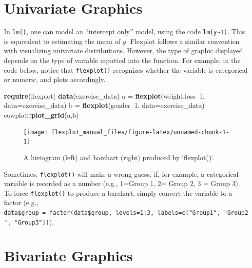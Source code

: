 \documentclass[,]{book}
\newenvironment{Shaded}{\begin{snugshade}}{\end{snugshade}}
\newcommand{\KeywordTok}[1]{\textcolor[rgb]{0.13,0.29,0.53}{\textbf{#1}}}
\newcommand{\DataTypeTok}[1]{\textcolor[rgb]{0.13,0.29,0.53}{#1}}
\newcommand{\DecValTok}[1]{\textcolor[rgb]{0.00,0.00,0.81}{#1}}
\newcommand{\StringTok}[1]{\textcolor[rgb]{0.31,0.60,0.02}{#1}}
\newcommand{\OperatorTok}[1]{\textcolor[rgb]{0.81,0.36,0.00}{\textbf{#1}}}
\newcommand{\NormalTok}[1]{#1}
\begin{document}
\chapter*{Univariate Graphics}\label{univariate-graphics}

In \texttt{lm()}, one can model an ``intercept only'' model, using the
code \texttt{lm(y\textasciitilde{}1)}. This is equivalent to estimating
the mean of \(y\). Flexplot follows a similar convention with
visualizing univariate distributions. However, the type of graphic
displayed depends on the type of variable inputted into the function.
For example, in the code below, notice that \texttt{flexplot()}
recognizes whether the variable is categorical or numeric, and plots
accordingly.

\begin{Shaded}
\begin{Highlighting}[]
\KeywordTok{require}\NormalTok{(flexplot)}
\KeywordTok{data}\NormalTok{(exercise_data)}
\NormalTok{a =}\StringTok{ }\KeywordTok{flexplot}\NormalTok{(weight.loss}\OperatorTok{~}\DecValTok{1}\NormalTok{, }\DataTypeTok{data=}\NormalTok{exercise_data)}
\NormalTok{b =}\StringTok{ }\KeywordTok{flexplot}\NormalTok{(gender}\OperatorTok{~}\DecValTok{1}\NormalTok{, }\DataTypeTok{data=}\NormalTok{exercise_data)}
\NormalTok{cowplot}\OperatorTok{::}\KeywordTok{plot_grid}\NormalTok{(a,b)}
\end{Highlighting}
\end{Shaded}

\begin{figure}

{\centering \texttt{[image: flexplot\_manual\_files/figure-latex/unnamed-chunk-1-1]} 

}

\caption{A histogram (left) and barchart (right) produced by `flexplot()`.}\label{fig:unnamed-chunk-1}
\end{figure}

Sometimes, \texttt{flexplot()} will make a wrong guess, if, for example,
a categorical variable is recorded as a number (e.g., 1=Group 1, 2=
Group 2, 3 = Group 3). To force \texttt{flexplot()} to produce a
barchart, simply convert the variable to a factor (e.g.,
\texttt{data\$group\ =\ factor(data\$group,\ levels=1:3,\ labels=c("Group1",\ "Group2",\ "Group3"))}).

\chapter*{Bivariate Graphics}\label{bivariate-graphics}
\end{document}
